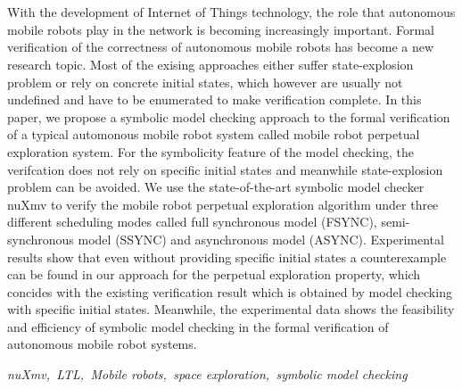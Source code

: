 \newpage
\vspace{-1cm}
\chapter*{}
\vspace{-0.5cm}

With the development of Internet of Things technology, the role that autonomous mobile robots play in the network is becoming increasingly important. Formal verification of the correctness of autonomous mobile robots has become a new research topic. Most of the exising approaches either suffer state-explosion problem or rely on concrete initial states, which however are usually not undefined and have to be enumerated to make verification complete. In this paper, we propose a symbolic model checking approach to the formal verification of a typical automonous mobile robot system called mobile robot perpetual exploration system. For the symbolicity feature of the model checking, the verifcation does not rely on specific initial states and meanwhile state-explosion problem can be avoided. We use the state-of-the-art symbolic model checker nuXmv to verify the mobile robot perpetual exploration algorithm under three different scheduling modes called full synchronous model (FSYNC), semi-synchronous model (SSYNC) and asynchronous model (ASYNC). Experimental results show that even without providing specific initial states a counterexample can be found in our approach for the perpetual exploration property, which concides with the existing verification result which is obtained by model checking with specific initial states. Meanwhile, the experimental data shows the feasibility and efficiency of symbolic model checking in the formal verification of autonomous mobile robot systems.

\hspace{-0.5cm}

{} \textit{nuXmv,\, LTL,\, Mobile robots,\, space exploration,\, symbolic model checking
}
































